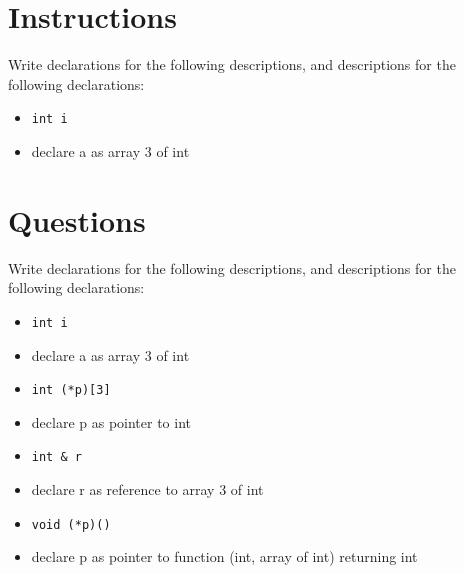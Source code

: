 \section*{Instructions}

{
  \long{}
  Write declarations for the following descriptions, and descriptions for the
  following declarations:
  \begin{itemize}
    \item \texttt{int i}
    \item declare a as array 3 of int
  \end{itemize}
}

\section*{Questions}

Write declarations for the following descriptions, and descriptions for the
following declarations:
\begin{itemize}

  \item \texttt{int i}
    \vfill

  \item declare a as array 3 of int
    \vfill

  \item \texttt{int (*p)[3]}
    \vfill

  \item declare p as pointer to int
    \vfill

  \item \texttt{int & r}
    \vfill

  \item declare r as reference to array 3 of int
    \vfill

  \item \texttt{void (*p)()}
    \vfill

  \item declare p as pointer to function (int, array of int) returning int
    \vfill

\end{itemize}

